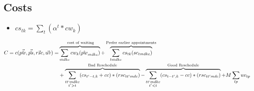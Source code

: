 \subsection{Costs}

\begin{itemize}
	\item $cs_{tk} = \sum_t (\alpha^t * cw_{k})$
\end{itemize}

\begin{equation}\begin{alignedat}{10}
		& C = c(\vec{\hat{pw}}, \vec{\hat{ps}}, \vec{rsc}, \vec{uv}) = 
		&& 
		\overbrace{ \sum_{mdkc} cw_{k} (\hat{pw}_{mdkc}) }^\text{
			cost of waiting}  + 
		\overbrace{
			\sum_{tmdkc} cs_{tk} (sc_{tmdkc})
		}^\text{Prefer earlier appointments} \\ 
		&	&&  +
		\overbrace{
			\sum_{
				\substack{tt`mdkc \\ t' > t}} 
			(cs_{t'-t, k} + cc) * (rsc_{tt'mdc})}^\text{Bad Reschedule} - 
		\overbrace{ 
			\sum_{
				\substack{tt`mdkc \\ t' < t}}
			(cs_{t-t', k} - cc) * (rsc_{tt'mdc})}^\text{Good Reschedule} + 
		M \sum_{tp} uv_{tp}
\end{alignedat}\end{equation}